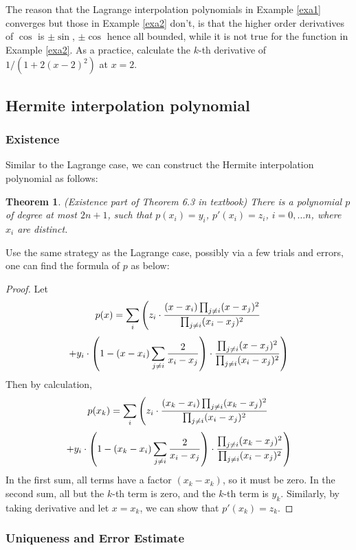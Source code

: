 \documentclass[20pt]{article} %
\theoremstyle{break}
\newtheorem{thm}[definition]{Theorem}
\begin{document}
The reason that the Lagrange interpolation polynomials in Example \ref{exa1} converges but those in Example \ref{exa2} don't, is that the higher order derivatives of $\cos$ is $\pm \sin$, $\pm \cos$ hence all bounded, while it is not true for the function in Example \ref{exa2}. As a practice, calculate the $k$-th derivative of $1/(1+2(x-2)^2)$ at $x=2$.

\newpage

\subsection{Hermite interpolation polynomial}

\subsubsection{Existence}

Similar to the Lagrange case, we can construct the Hermite interpolation polynomial as follows:
\begin{thm}\label{ext_her} (Existence part of Theorem 6.3 in textbook) There is a polynomial $p$ of degree at most $2n+1$, such that $p(x_i)=y_i$, $p'(x_i)=z_i$, $i=0, \dots n$, where $x_i$ are distinct.
\end{thm}
Use the same strategy as the Lagrange case, possibly via a few trials and errors, one can find the formula of $p$ as below:
\begin{proof}
  Let
  \[p(x)=\sum_i\left( z_i\cdot {(x-x_i)\prod_{j\not=i}(x-x_j)^2\over \prod_{j\not=i}(x_i-x_j)^2}\right. \]
  \[\left. +y_i\cdot \left(1-(x-x_i)\sum_{j\not=i}{2\over x_i-x_j}\right)\cdot {\prod_{j\not=i}(x-x_j)^2\over \prod_{j\not=i}(x_i-x_j)^2} \right)\]
  Then by calculation,
  \[p(x_k)=\sum_i\left( z_i\cdot {(x_k-x_i)\prod_{j\not=i}(x_k-x_j)^2\over \prod_{j\not=i}(x_i-x_j)^2}\right. \]
  \[\left. +y_i\cdot \left(1-(x_k-x_i)\sum_{j\not=i}{2\over x_i-x_j}\right)\cdot {\prod_{j\not=i}(x_k-x_j)^2\over \prod_{j\not=i}(x_i-x_j)^2} \right)\]
  In the first sum, all terms have a factor $(x_k-x_k)$, so it must be zero. In the second sum, all but the $k$-th term is zero, and the $k$-th term is $y_k$.
  Similarly, by taking derivative and let $x=x_k$, we can show that $p'(x_k)=z_k$.
  \end{proof}

\newpage
  
\subsubsection{Uniqueness and Error Estimate}
  
\end{document}
